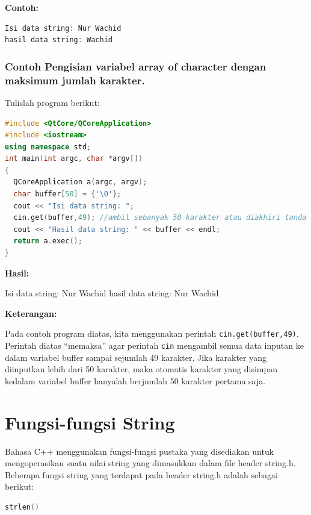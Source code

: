 \textbf{Contoh:}

\begin{lstlisting}[language=c++, numbers=none]
Isi data string: Nur Wachid
hasil data string: Wachid
\end{lstlisting}

\subsubsection*{Contoh  Pengisian variabel array of character dengan maksimum jumlah karakter.}

Tulislah program berikut:

\begin{lstlisting}[language=c++, caption=Pengisian variabel array of character dengan maksimum jumlah
karakter, label=contoh3-18]
#include <QtCore/QCoreApplication>
#include <iostream>
using namespace std;
int main(int argc, char *argv[])
{
  QCoreApplication a(argc, argv);
  char buffer[50] = {'\0'};
  cout << "Isi data string: ";
  cin.get(buffer,49); //ambil sebanyak 50 karakter atau diakhiri tanda enter
  cout << "Hasil data string: " << buffer << endl;
  return a.exec();
}
\end{lstlisting}

\textbf{Hasil:}
\begin{lcverbatim}
Isi data string: Nur Wachid
hasil data string: Nur Wachid
\end{lcverbatim}


\textbf{Keterangan:}

Pada contoh program diatas, kita menggunakan perintah
\texttt{cin.get(buffer,49)}. Perintah diatas ``memaksa'' agar perintah
\texttt{cin} mengambil semua data inputan ke dalam variabel buffer
sampai sejumlah 49 karakter. Jika karakter yang diinputkan lebih dari 50
karakter, maka otomatis karakter yang disimpan kedalam variabel buffer
hanyalah berjumlah 50 karakter pertama saja.

\section{Fungsi-fungsi String}\label{fungsi-fungsi-string}

Bahasa C++ menggunakan fungsi-fungsi pustaka yang disediakan untuk
mengoperasikan suatu nilai string yang dimasukkan dalam file header
string.h. Beberapa fungsi string yang terdapat pada header string.h
adalah sebagai berikut:

\begin{lstlisting}[language=c++, numbers=none]
strlen()
\end{lstlisting}

